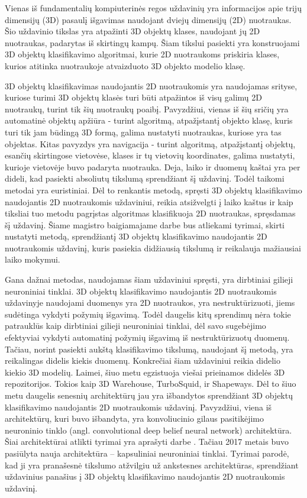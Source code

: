 
Vienas iš fundamentalių kompiuterinės regos uždavinių yra informacijos apie trijų dimensijų (3D) pasaulį išgavimas naudojant dviejų dimensijų (2D) nuotraukas. Šio uždavinio tikslas yra atpažinti 3D objektų klases, naudojant jų 2D nuotraukas, padarytas iš skirtingų kampų. Šiam tikslui pasiekti yra konstruojami 3D objektų klasifikavimo algoritmai, kurie 2D nuotraukoms priskiria klases, kurios atitinka nuotraukoje atvaizduoto 3D objekto modelio klasę.

3D objektų klasifikavimas naudojantis 2D nuotraukomis yra naudojamas srityse, kuriose turimi 3D objektų klasės turi būti atpažintos iš visų galimų 2D nuotraukų, turint tik šių nuotraukų poaibį. Pavyzdžiui, vienas iš šių sričių yra automatinė objektų apžiūra - turint algoritmą, atpažįstantį objekto klasę, kuris turi tik jam būdingą 3D formą, galima nustatyti nuotraukas, kuriose yra tas objektas. Kitas pavyzdys yra navigacija - turint algoritmą, atpažįstantį objektų, esančių skirtingose vietovėse, klases ir tų vietovių koordinates, galima nustatyti, kurioje vietovėje buvo padaryta nuotrauka. Deja, laiko ir duomenų kaštai yra per dideli, kad pasiekti absoliutų tikslumą sprendžiant šį uždavinį. Todėl taikomi metodai yra euristiniai. Dėl to renkantis metodą, spręsti 3D objektų klasifikavimo naudojantis 2D nuotraukomis uždaviniui, reikia atsižvelgti į laiko kaštus ir kaip tiksliai tuo metodu pagrįstas algoritmas klasifikuoja 2D nuotraukas, spręsdamas šį uždavinį. Šiame magistro baigiamajame darbe bus atliekami tyrimai, skirti nustatyti metodą, sprendžiantį 3D objektų klasifikavimo naudojantis 2D nuotraukomis uždavinį, kuris pasiekia didžiausią tikslumą ir reikalauja mažiausiai laiko mokymui.

Gana dažnai metodas, naudojamas šiam uždaviniui spręsti, yra dirbtiniai gilieji neuroniniai tinklai. 3D objektų klasifikavimo naudojantis 2D nuotraukomis uždavinyje naudojami duomenys yra 2D nuotraukos, yra nestruktūrizuoti, jiems sudėtinga vykdyti požymių išgavimą. Todėl daugelis kitų sprendimų nėra tokie patrauklūs kaip dirbtiniai gilieji neuroniniai tinklai, dėl savo sugebėjimo efektyviai vykdyti automatinį požymių išgavimą iš nestruktūrizuotų duomenų. Tačiau, norint pasiekti aukštą klasifikavimo tikslumą, naudojant šį metodą, yra reikalingas didelis kiekis duomenų. Konkrečiai šiam uždaviniui reikia didelio kiekio 3D modelių. Laimei, šiuo metu egzistuoja viešai prieinamos didelės 3D repozitorijos. Tokios kaip 3D Warehouse, TurboSquid, ir Shapeways. Dėl to šiuo metu daugelis senesnių architektūrų jau yra išbandytos sprendžiant 3D objektų klasifikavimo naudojantis 2D nuotraukomis uždavinį. Pavyzdžiui, viena iš architektūrų, kuri buvo išbandyta, yra konvoliucinio gilaus pasitikėjimo neuroninio tinklo (angl. convolutional deep belief neural network) architektūra. Šiai architektūrai atlikti tyrimai yra aprašyti darbe \cite{dbnExp}. Tačiau 2017 metais buvo pasiūlyta nauja architektūra -- kapsuliniai neuroniniai tinklai. Tyrimai parodė, kad ji yra pranašesnė tikslumo atžvilgiu už ankstesnes architektūras, sprendžiant uždavinius panašius į 3D objektų klasifikavimo naudojantis 2D nuotraukomis uždavinį.

